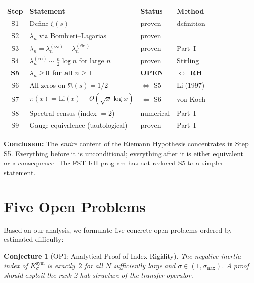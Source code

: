 \documentclass[12pt,a4paper]{article}
\newtheorem{conjecture}[theorem]{Conjecture}
\theoremstyle{definition}
\theoremstyle{remark}
\newcommand{\Ksym}{K_\sigma^{\mathrm{sym}}}
\begin{document}
\begin{center}
\renewcommand{\arraystretch}{1.2}
\begin{tabular}{c|l|l|l}
\textbf{Step} & \textbf{Statement} & \textbf{Status} & \textbf{Method} \\\hline
S1 & Define $\xi(s)$ & proven & definition \\
S2 & $\lambda_n$ via Bombieri--Lagarias & proven & \cite{BombieriLagarias1999} \\
S3 & $\lambda_n = \lambda_n^{(\infty)} + \lambda_n^{(\mathrm{fin})}$ & proven & Part~I \\
S4 & $\lambda_n^{(\infty)} \sim \frac{n}{2}\log n$ for large $n$ & proven & Stirling \\
\textbf{S5} & \textbf{$\lambda_n \geq 0$ for all $n \geq 1$} & \textbf{OPEN} & \textbf{$\Longleftrightarrow$ RH} \\
S6 & All zeros on $\Re(s) = 1/2$ & $\Leftrightarrow$ S5 & Li (1997) \\
S7 & $\pi(x) = \mathrm{Li}(x) + O(\sqrt{x}\log x)$ & $\Leftarrow$ S6 & von Koch \\
S8 & Spectral census (index $= 2$) & numerical & Part~I \\
S9 & Gauge equivalence (tautological) & proven & Part~I \\
\end{tabular}
\end{center}

\noindent\textbf{Conclusion:} The \emph{entire} content of the Riemann Hypothesis concentrates in Step S5. Everything before it is unconditional; everything after it is either equivalent or a consequence. The FST-RH program has not reduced S5 to a simpler statement.


\section{Five Open Problems}
\label{sec:open-problems}

Based on our analysis, we formulate five concrete open problems ordered by estimated difficulty:

\begin{conjecture}[OP1: Analytical Proof of Index Rigidity]
The negative inertia index of $\Ksym$ is exactly~$2$ for all $N$ sufficiently large and $\sigma \in (1, \sigma_{\max})$. A proof should exploit the rank-2 hub structure of the transfer operator.
\end{conjecture}
\end{document}
